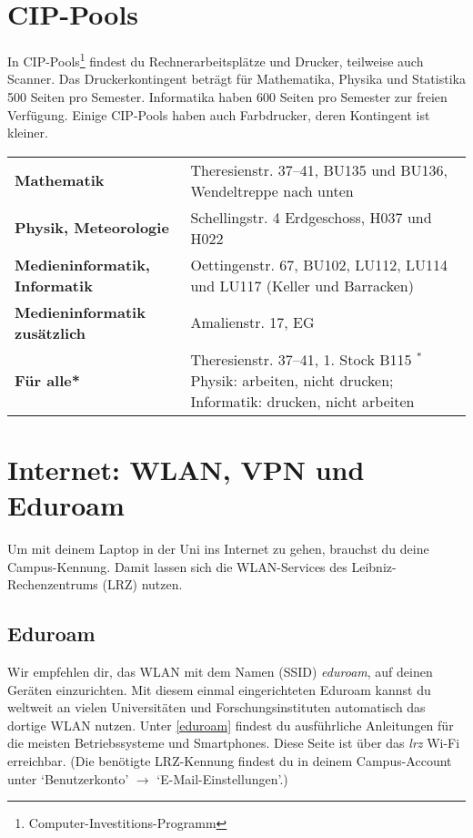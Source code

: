 \section{CIP-Pools}
In CIP-Pools\footnote{Computer-Investitions-Programm} findest du Rechnerarbeitsplätze und Drucker, teilweise auch Scanner. Das Druckerkontingent beträgt für Mathematika, Physika und Statistika 500 Seiten pro Semester. Informatika haben 600 Seiten pro Semester zur freien Verfügung. Einige CIP-Pools haben auch Farbdrucker, deren Kontingent ist kleiner.

\begin{tabularx}{\linewidth}{lX}
\textbf{Mathematik}                   & Theresienstr. 37--41, BU135 und BU136, Wendeltreppe nach unten\\
\textbf{Physik, Meteorologie}         & Schellingstr. 4 Erdgeschoss, H037 und H022\\
\textbf{Medieninformatik, Informatik} & Oettingenstr. 67, BU102, LU112, LU114 und LU117 (Keller und Barracken)\\
\textbf{Medieninformatik zusätzlich}  & Amalienstr. 17, EG\\
\textbf{Für alle*}                    & Theresienstr. 37--41, 1. Stock B115 \newline
\footnotesize{$^*$Physik: arbeiten, nicht drucken; \newline $\phantom{^*}$Informatik: drucken, nicht arbeiten}
\end{tabularx}

\section{Internet: WLAN, VPN und Eduroam}
Um mit deinem Laptop in der Uni ins Internet zu gehen, brauchst du
deine Campus-Kennung. Damit lassen sich die WLAN-Services des
Leibniz-Rechen\-zentrums (LRZ) nutzen.

\subsection*{Eduroam}
Wir empfehlen dir, das WLAN mit dem Namen (SSID) \emph{eduroam}, auf deinen Geräten einzurichten. Mit diesem einmal eingerichteten Eduroam kannst du weltweit an vielen Universitäten und Forschungsinstituten automatisch das dortige WLAN nutzen. Unter \ref{eduroam} findest du ausführliche Anleitungen für die meisten Betriebssysteme und Smart\-phones.
Diese Seite ist über das \emph{lrz} Wi-Fi erreichbar.
(Die benötigte LRZ-Kennung findest du in deinem Campus-Account unter `Benutzerkonto' $\rightarrow$ `E-Mail-Einstellungen'.)

